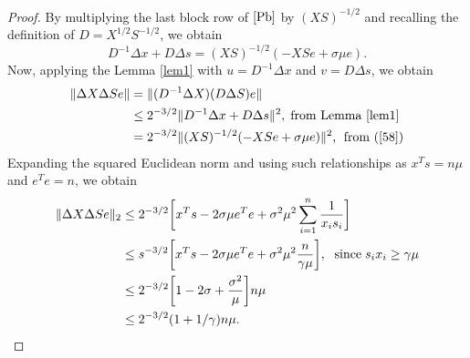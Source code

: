 \documentclass[a4paper,10 pt,titlepage,twoside]{book}
\theoremstyle{plain}
\theoremstyle{definition}
\theoremstyle{remark}
\begin{document}
\begin{proof}
	By multiplying the last block row of $\ref{Pb}$ by $(XS)^{-1/2}$ and recalling the definition of $D = X^{1/2}S^{-1/2}$, we obtain 
	\begin{equation}\label{58}
	D^{-1}\Delta x + D \Delta s = (XS)^{-1/2}(-XSe + \sigma \mu e).
	\end{equation}
	Now, applying the Lemma \ref{lem1} with $u= D^{-1}\Delta x$ and $v = D \Delta s$, we obtain
	\begin{align*}
	\lVert \Delta X \Delta S e\rVert &= \lVert(D^{-1}\Delta X)(D\Delta S)e \rVert \\
	&\leq 2^{-3/2}\lVert D^{-1}\Delta x + D \Delta s\rVert^{2}, \text{\;from Lemma \ref{lem1}}\\
	&= 2^{-3/2}\lVert (XS)^{-1/2}(-XSe + \sigma \mu e)\rVert ^{2} \text{,\; from (\ref{58})}\\
	\end{align*}
	Expanding the squared Euclidean norm and using such relationships as $x^{T}s = n\mu$ and $e^{T}e = n$, we obtain
	\begin{align*}
	\lVert \Delta X \Delta S e\rVert_{2} &\leq 2^{-3/2}\bigg[x^{T}s - 2\sigma \mu e^{T}e + \sigma^{2}\mu^{2}\sum\limits_{i = 1}^{n}\frac{1}{x_{i}s_{i}}\bigg]\\
	&\leq s^{-3/2}\bigg[x^{T}s - 2\sigma \mu e^{T}e + \sigma^{2}\mu^{2}\frac{n}{\gamma \mu}\bigg], \text{\; since\;} s_{i}x_{i} \geq \gamma \mu\\
	&\leq 2^{-3/2}\bigg[1 - 2\sigma + \frac{\sigma^{2}}{\mu}\bigg]n \mu\\
	&\leq 2^{-3/2}(1 + 1/\gamma)n \mu.
	\end{align*}
\end{proof}
\end{document}
